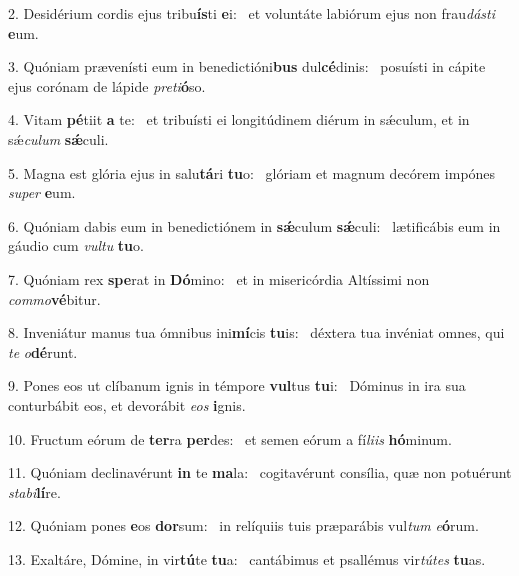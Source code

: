 2. Desidérium cordis ejus tribu\textbf{ís}ti \textbf{e}i: \ast\  et voluntáte labiórum ejus non frau\textit{dás}\textit{ti} \textbf{e}um.\

3. Quóniam prævenísti eum in benedictióni\textbf{bus} dul\textbf{cé}dinis: \ast\  posuísti in cápite ejus corónam de lápide \textit{pre}\textit{ti}\textbf{ó}so.\

4. Vitam \textbf{pé}tiit \textbf{a} te: \ast\  et tribuísti ei longitúdinem diérum in sǽculum, et in sǽ\textit{cu}\textit{lum} \textbf{sǽ}culi.\

5. Magna est glória ejus in salu\textbf{tá}ri \textbf{tu}o: \ast\  glóriam et magnum decórem impónes \textit{su}\textit{per} \textbf{e}um.\

6. Quóniam dabis eum in benedictiónem in \textbf{sǽ}culum \textbf{sǽ}culi: \ast\  lætificábis eum in gáudio cum \textit{vul}\textit{tu} \textbf{tu}o.\

7. Quóniam rex \textbf{spe}rat in \textbf{Dó}mino: \ast\  et in misericórdia Altíssimi non \textit{com}\textit{mo}\textbf{vé}bitur.\

8. Inveniátur manus tua ómnibus ini\textbf{mí}cis \textbf{tu}is: \ast\  déxtera tua invéniat omnes, qui \textit{te} \textit{o}\textbf{dé}runt.\

9. Pones eos ut clíbanum ignis in témpore \textbf{vul}tus \textbf{tu}i: \ast\  Dóminus in ira sua conturbábit eos, et devorábit \textit{e}\textit{os} \textbf{i}gnis.\

10. Fructum eórum de \textbf{ter}ra \textbf{per}des: \ast\  et semen eórum a fí\textit{li}\textit{is} \textbf{hó}minum.\

11. Quóniam declinavérunt \textbf{in} te \textbf{ma}la: \ast\  cogitavérunt consília, quæ non potuérunt \textit{sta}\textit{bi}\textbf{lí}re.\

12. Quóniam pones \textbf{e}os \textbf{dor}sum: \ast\  in relíquiis tuis præparábis vul\textit{tum} \textit{e}\textbf{ó}rum.\

13. Exaltáre, Dómine, in vir\textbf{tú}te \textbf{tu}a: \ast\  cantábimus et psallémus vir\textit{tú}\textit{tes} \textbf{tu}as.\


